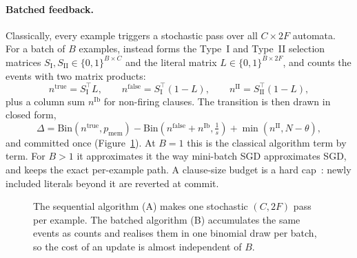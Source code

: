 \documentclass[10.5pt,a4paper]{article}
\begin{document}
\paragraph{Batched feedback.} Classically, every example triggers a stochastic pass over all
$C\times 2F$ automata. For a batch of $B$ examples, \ttlibname instead forms the Type~I and
Type~II selection matrices $S_{\mathrm{I}}, S_{\mathrm{II}} \in \{0,1\}^{B\times C}$ and the
literal matrix $L \in \{0,1\}^{B\times 2F}$, and counts the events with two matrix products:
\begin{equation*}
  n^{\text{true}} = S_{\mathrm{I}}^{\!\top} L,\qquad
  n^{\text{false}} = S_{\mathrm{I}}^{\!\top} (1-L),\qquad
  n^{\text{II}} = S_{\mathrm{II}}^{\!\top} (1-L),
\end{equation*}
plus a column sum $n^{\text{Ib}}$ for non-firing clauses. The transition is then drawn in
closed form,
\begin{equation*}
  \Delta = \mathrm{Bin}\!\left(n^{\text{true}}, p_{\text{mem}}\right)
  - \mathrm{Bin}\!\left(n^{\text{false}} + n^{\text{Ib}}, \tfrac{1}{s}\right)
  + \min\!\left(n^{\text{II}}, N-\theta\right),
\end{equation*}
and committed once (Figure~\ref{fig:s-batched}). At $B=1$ this is the classical algorithm
term by term. For $B>1$ it approximates it the way mini-batch SGD approximates SGD, and
 keeps the exact per-example path. A clause-size budget is
a hard cap~: newly included literals beyond it are reverted at commit.

\begin{figure}[htbp]
\centering
\resizebox{0.92\linewidth}{!}{}
\caption{The sequential algorithm (A) makes one stochastic $(C,2F)$ pass per example. The
  batched algorithm (B) accumulates the same events as counts and realises them in one
  binomial draw per batch, so the cost of an update is almost independent of $B$.}
\label{fig:s-batched}
\end{figure}
\end{document}
